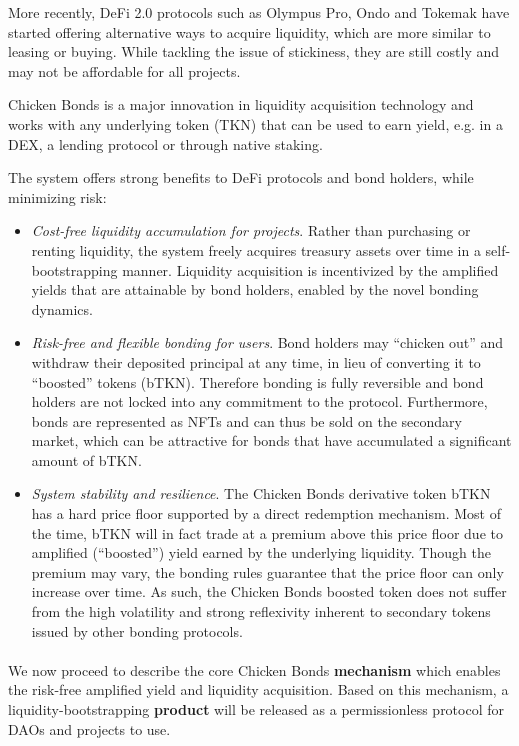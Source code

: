 \documentclass{article}
\begin{document}
More recently, DeFi 2.0 protocols such as Olympus Pro, Ondo and Tokemak have started offering alternative ways to acquire liquidity, which are more similar to leasing or buying. While tackling the issue of stickiness, they are still costly and may not be affordable for all projects.

Chicken Bonds is a major innovation in liquidity acquisition technology and works with any underlying token (TKN) that can be used to earn yield, e.g. in a DEX, a lending protocol or through native staking.

The system offers strong benefits to DeFi protocols and bond holders, while minimizing risk:

\begin{itemize}
    \item \textit{Cost-free liquidity accumulation for projects}. Rather than purchasing or renting liquidity, the system freely acquires treasury assets over time in a self-bootstrapping manner. Liquidity acquisition is incentivized by the amplified yields that are attainable by bond holders, enabled by the novel bonding dynamics.
    \item \textit{Risk-free and flexible bonding for users}. Bond holders may “chicken out” and withdraw their deposited principal at any time, in lieu of converting it to “boosted” tokens (bTKN). Therefore bonding is fully reversible and bond holders are not locked into any commitment to the protocol. Furthermore, bonds are represented as NFTs and can thus be sold on the secondary market, which can be attractive for bonds that have accumulated a significant amount of bTKN.
    \item \textit{System stability and resilience}. The Chicken Bonds derivative token bTKN has a hard price floor supported by a direct redemption mechanism. Most of the time, bTKN will in fact trade at a premium above this price floor due to amplified (“boosted”) yield earned by the underlying liquidity. Though the premium may vary, the bonding rules guarantee that the price floor can only increase over time. As such, the Chicken Bonds boosted token does not suffer from the high volatility and strong reflexivity inherent to secondary tokens issued by other bonding protocols.
\end{itemize}

\paragraph{}

We now proceed to describe the core Chicken Bonds \textbf{mechanism} which enables the risk-free amplified yield and liquidity acquisition. Based on this mechanism, a liquidity-bootstrapping \textbf{product} will be released as a permissionless protocol for DAOs and projects to use.
\end{document}

